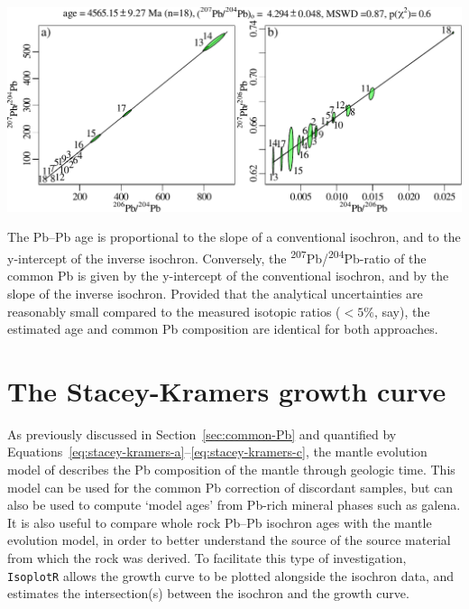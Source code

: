 \begin{refsection}
\begin{center}
  \includegraphics[width=.9\linewidth]{../figures/PbPb.pdf}\\
\end{center}

The Pb--Pb age is proportional to the slope of a conventional
isochron, and to the y-intercept of the inverse isochron. Conversely,
the \textsuperscript{207}Pb/\textsuperscript{204}Pb-ratio of the
common Pb is given by the y-intercept of the conventional isochron,
and by the slope of the inverse isochron. Provided that the analytical
uncertainties are reasonably small compared to the measured isotopic
ratios ($<5\%$, say), the estimated age and common Pb composition are
identical for both approaches.

\section{The Stacey-Kramers growth curve}\label{sec:SKgrowth}

As previously discussed in Section~\ref{sec:common-Pb} and quantified
by Equations~\ref{eq:stacey-kramers-a}--\ref{eq:stacey-kramers-c}, the
mantle evolution model of \citet{stacey1975} describes the Pb
composition of the mantle through geologic time. This model can be
used for the common Pb correction of discordant samples, but can also
be used to compute `model ages' from Pb-rich mineral phases such as
galena. It is also useful to compare whole rock Pb--Pb isochron ages
with the mantle evolution model, in order to better understand the
source of the source material from which the rock was derived.  To
facilitate this type of investigation, \texttt{IsoplotR} allows the
\citet{stacey1975} growth curve to be plotted alongside the isochron
data, and estimates the intersection(s) between the isochron and the
growth curve.


\end{refsection}
